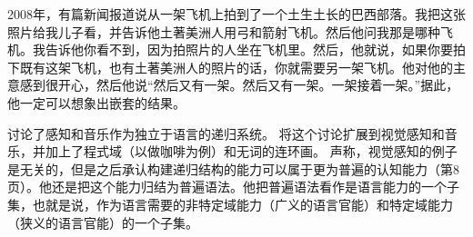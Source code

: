 2008年，有篇新闻报道说从一架飞机上拍到了一个土生土长的巴西部落。我把这张照片给我儿子看，并告诉他土著美洲人用弓和箭射飞机。然后他问我那是哪种飞机。我告诉他你看不到，因为拍照片的人坐在飞机里。然后，他就说，如果你要拍下既有这架飞机，也有土著美洲人的照片的话，你就需要另一架飞机。他对他的主意感到很开心，然后他说“然后又有一架。然后又有一架。一架接着一架。”据此，他一定可以想象出嵌套的结果。

 \citet[--114]{CJ2005a}讨论了感知和音乐作为独立于语言的递归系统。 \citet{Jackendoff2011a}将这个讨论扩展到视觉感知和音乐，并加上了程式域（以做咖啡为例）和无词的连环画。 \citet[--8]{Chomsky2007a}声称，视觉感知的例子是无关的，但是之后承认构建递归结构的能力可以属于更为普遍的认知能力（第8页）。他还是把这个能力归结为普遍语法。他把普遍语法看作是语言能力的一个子集，也就是说，作为语言需要的非特定域能力（广义的语言官能）和特定域能力（狭义的语言官能）的一个子集。

